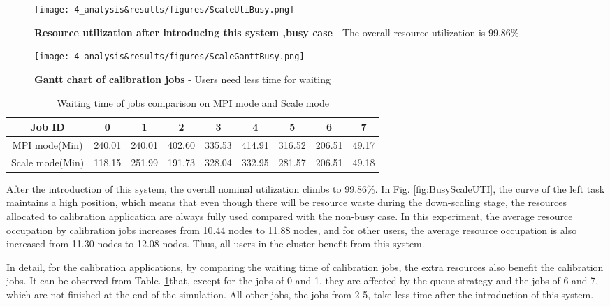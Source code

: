 \begin{figure}
    \centering
    \begin{minipage}{.48\textwidth}
      \centering
      \texttt{[image: 4\_analysis\&results/figures/ScaleUtiBusy.png]}
      \caption[Resource utilization after introducing this system ,busy case]{{\small\textbf{Resource utilization after introducing this system ,busy case} - The overall resource utilization is 99.86\%}}
      \label{fig:BusyScaleUTI}
    \end{minipage} 
    \begin{minipage}{.48\textwidth}
      \centering
      \texttt{[image: 4\_analysis\&results/figures/ScaleGanttBusy.png]}
      \caption[Gantt chart of calibration jobs]{{\small\textbf{Gantt chart of calibration jobs} - Users need less time for waiting}}
      \label{fig:BusyScalegantt}
    \end{minipage}
\end{figure}
\begin{table}[]
    \centering
    \begin{tabular}{ccccccccc}
    \hline
    Job ID         & 0      & 1      & 2      & 3      & 4      & 5      & 6      & 7     \\
    \hline
    MPI mode(Min)   & 240.01 & 240.01 & 402.60 & 335.53 & 414.91 & 316.52 & 206.51 & 49.17 \\
    Scale mode(Min) & 118.15 & 251.99 & 191.73 & 328.04 & 332.95 & 281.57 & 206.51 & 49.18
    \end{tabular}
    \caption{Waiting time of jobs comparison on MPI mode and Scale mode}
    \label{tab:waittimecomparison}
\end{table}
After the introduction of this system, the overall nominal utilization climbs to 99.86\%. 
In Fig. \ref{fig:BusyScaleUTI}, the curve of the left task maintains a high position, which means that even though there will be resource waste during the down-scaling stage, the resources allocated to calibration application are always fully used compared with the non-busy case.
In this experiment, the average resource occupation by calibration jobs increases from 10.44 nodes to 11.88 nodes, and for other users, the average resource occupation is also increased from 11.30 nodes to 12.08 nodes.
Thus, all users in the cluster benefit from this system.

In detail, for the calibration applications, by comparing the waiting time of calibration jobs, the extra resources also benefit the calibration jobs.
It can be observed from  Table. \ref{tab:waittimecomparison}that, except for the jobs of 0 and 1, they are affected by the queue strategy and the jobs of 6 and 7, which are not finished at the end of the simulation. 
All other jobs, the jobs from 2-5, take less time after the introduction of this system.

